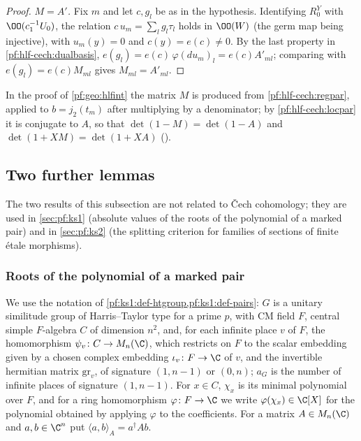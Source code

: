 \begin{proof}
\emph{$M=A'$.} Fix $m$ and let $c,g_l$ be as in the hypothesis. Identifying $R^Y_0$ with $\OO(c_1^{-1}U_0)$, the relation $c\,u_m=\sum_lg_l\tau_l$ holds in
$\OO(W)$ (the germ map being injective), with $u_m(y)=0$ and $c(y)=e(c)\ne0$. By the last property in \cref{pf:hlf-cech:dualbasis},
$e(g_l)=e(c)\,\varphi(du_m)_l=e(c)A'_{ml}$; comparing with $e(g_l)=e(c)M_{ml}$ gives $M_{ml}=A'_{ml}$.
\end{proof}

\begin{remark}\label{pf:hlf-cech:rem:locpar}
In the proof of \cref{pf:geo:hlfint} the matrix $M$ is produced from \cref{pf:hlf-cech:regpar}, applied to $b=j_2(t_m)$ after multiplying by a
denominator; by \cref{pf:hlf-cech:locpar} it is conjugate to $A$, so that $\det(1-M)=\det(1-A)$ and $\det(1+XM)=\det(1+XA)$
().
\end{remark}

\subsection{Two further lemmas}\label{sec:pf:hlf-cech:misc}

The two results of this subsection are not related to \v{C}ech cohomology; they are used in \cref{sec:pf:ks1} (absolute values of
the roots of the polynomial of a marked pair) and in \cref{sec:pf:ks2} (the splitting criterion for families of sections of finite
\'etale morphisms).

\subsubsection{Roots of the polynomial of a marked pair}

We use the notation of \cref{pf:ks1:def-htgroup,pf:ks1:def-pairs}: $G$ is a unitary similitude group of Harris--Taylor type for a
prime $p$, with CM field $F$, central simple $F$-algebra $C$ of dimension $n^2$, and, for each infinite place $v$ of $F$, the
homomorphism $\psi_v\colon C\to M_n(\C)$, which restricts on $F$ to the scalar embedding given by a chosen complex embedding
$\iota_v\colon F\to\C$ of $v$, and the invertible hermitian matrix $\mathrm{gr}_v$, of signature $(1,n-1)$ or $(0,n)$; $a_G$ is the
number of infinite places of signature $(1,n-1)$. For $x\in C$, $\chi_x$ is its minimal polynomial over $F$, and for a ring
homomorphism $\varphi\colon F\to\C$ we write $\varphi(\chi_x)\in\C[X]$ for the polynomial obtained by applying $\varphi$ to the
coefficients. For a matrix $A\in M_n(\C)$ and $a,b\in\C^n$ put $\langle a,b\rangle_A=a^\dagger Ab$.

